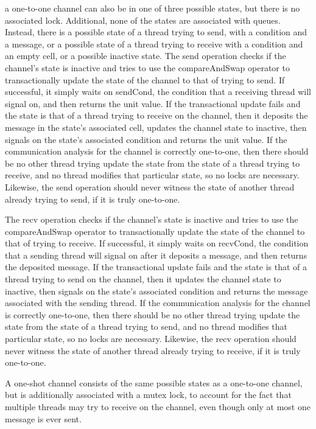 \documentclass{article}
\begin{document}
a one-to-one channel can also be in one of three possible states, but there is no associated
lock. Additional, none of the states are associated with queues.  Instead, there is a possible
state of a thread trying to send, with a condition and a message, or a possible state of a
thread trying to receive with a condition and an empty cell, or a possible inactive state.
The send operation checks if the channel's state is inactive and tries to use the
compareAndSwap operator to transactionally update the state of the channel to that of trying to
send.  If successful, it simply waits on sendCond, the condition that a receiving thread will
signal on, and then returns the unit value.  If the transactional update fails and the state is
that of a thread trying to receive on the channel, then it deposits the message in the state's
associated cell, updates the channel state to inactive, then signals on the state's associated
condition and returns the unit value.  If the communication analysis for the channel is
correctly one-to-one, then there should be no other thread trying update the state from the
state of a thread trying to receive, and no thread modifies that particular state, so no locks
are necessary.  Likewise, the send operation should never witness the state of another thread
already trying to send, if it is truly one-to-one.

The recv operation checks if the channel's state is inactive and tries to use the
compareAndSwap operator to transactionally update the state of the channel to that of trying
to receive.  If successful, it simply waits on recvCond, the condition that a sending thread
will signal on after it deposits a message, and then returns the deposited message.  If the
transactional update fails and the state is that of a thread trying to send on the channel,
then it updates the channel state to inactive, then signals on the state's associated
condition and returns the message associated with the sending thread.  If the communication
analysis for the channel is correctly one-to-one, then there should be no other thread trying
update the state from the state of a thread trying to send, and no thread modifies that
particular state, so no locks are necessary.  Likewise, the recv operation should never
witness the state of another thread already trying to receive, if it is truly one-to-one.


A one-shot channel consists of the same possible states as a one-to-one channel, but is
additionally associated with a mutex lock, to account for the fact that multiple threads may
try to receive on the channel, even though only at most one message is ever sent.
\end{document}
